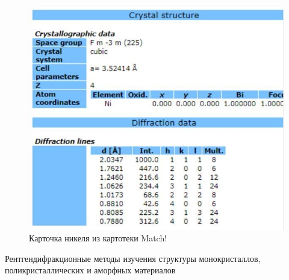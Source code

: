 \documentclass[a4paper, 12pt]{article}
\begin{document}
\begin{figure}[H]
	\centering
	\includegraphics[width=0.5\linewidth]{Nikel}
	\caption{Карточка никеля из картотеки Match!}
	\label{fig:Nikel}
\end{figure}


\newpage

\begin{thebibliography}{1}
	Рентгендифракционные методы изучения структуры монокристаллов, поликристаллических и аморфных материалов
\end{thebibliography}
\end{document}
